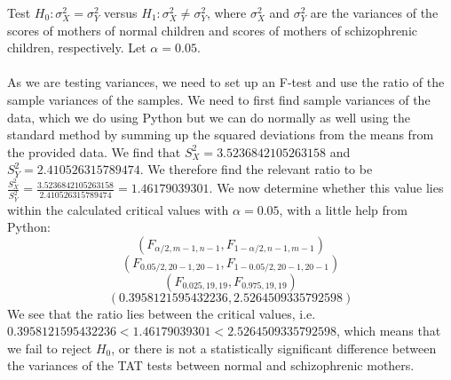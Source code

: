 \documentclass{article}
\begin{document}
{Test \(H_0: \sigma^2_X = \sigma^2_Y\) versus \(H_1: \sigma^2_X \neq \sigma^2_Y\), where \(\sigma^2_X\) and \(\sigma^2_Y\) are the variances of the scores of mothers of normal children and scores of mothers of schizophrenic children, respectively. Let \(\alpha = 0.05\).
\\
\\
As we are testing variances, we need to set up an F-test and use the ratio of the sample variances of the samples. We need to first find sample variances of the data, which we do using Python but we can do normally as well using the standard method by summing up the squared deviations from the means from the provided data. We find that \(S^2_X = 3.5236842105263158\) and \(S^2_Y = 2.410526315789474\). We therefore find the relevant ratio to be \(\frac{S^2_X}{S^2_Y} = \frac{3.5236842105263158}{2.410526315789474} = 1.46179039301\). We now determine whether this value lies within the calculated critical values with \(\alpha = 0.05\), with a little help from Python:
\[
(F_{\alpha / 2, m - 1, n - 1}, F_{1 - \alpha / 2, n - 1, m - 1})
\]
\[
(F_{0.05 / 2, 20 - 1, 20 - 1}, F_{1 - 0.05 / 2, 20 - 1, 20 - 1})
\]
\[
(F_{0.025, 19, 19}, F_{0.975, 19, 19})
\]
\[
(0.3958121595432236, 2.5264509335792598)
\]
We see that the ratio lies between the critical values, i.e. \(0.3958121595432236 < 1.46179039301 < 2.5264509335792598\), which means that we fail to reject \(H_0\), or there is not a statistically significant difference between the variances of the TAT tests between normal and schizophrenic mothers.

}
\end{document}
